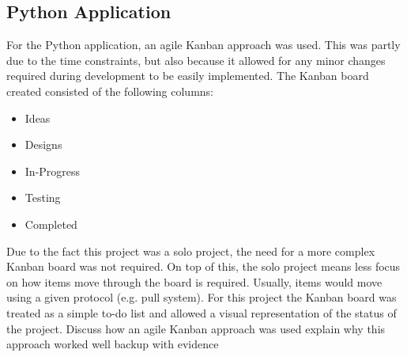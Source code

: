 \subsection{Python Application}
For the Python application, an agile Kanban approach was used. This was partly due to the time constraints, but also because it allowed for
any minor changes required during development to be easily implemented. The Kanban board created consisted of the following columns:
\begin{itemize}
    \item Ideas
    \item Designs
    \item In-Progress
    \item Testing
    \item Completed
\end{itemize}
Due to the fact this project was a solo project, the need for a more complex Kanban board was not required. On top of this, the solo project
means less focus on how items move through the board is required. Usually, items would move using a given protocol (e.g. pull system). For this
project the Kanban board was treated as a simple to-do list and allowed a visual representation of the status of the project.
Discuss how an agile Kanban approach was used
explain why this approach worked well
backup with evidence